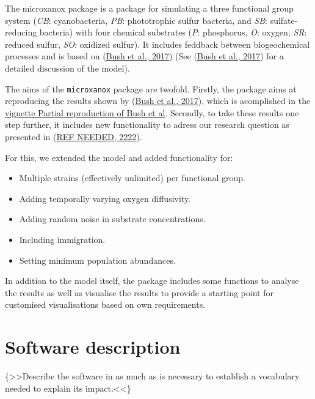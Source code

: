 \documentclass[]{elsarticle} %
\providecommand{\tightlist}{%
  \setlength{\itemsep}{0pt}\setlength{\parskip}{0pt}}
\begin{document}
The microxanox package is a package for simulating a three functional
group system (\emph{CB}: cyanobacteria, \emph{PB}: phototrophic sulfur
bacteria, and \emph{SB}: sulfate-reducing bacteria) with four chemical
substrates (\emph{P}: phosphorus, \emph{O}: oxygen, \emph{SR}: reduced
sulfur, \emph{SO}: oxidized sulfur). It includes feddback between
biogeochemical processes and is based on
(\protect\hyperlink{ref-Bush2017}{Bush et al., 2017}) (See
(\protect\hyperlink{ref-Bush2017}{Bush et al., 2017}) for a detailed
discussion of the model).

The aims of the \texttt{microxanox} package are twofold. Firstly, the
package aims at reproducing the results shown by
(\protect\hyperlink{ref-Bush2017}{Bush et al., 2017}), which is
acomplished in the \href{LINK\%20NEEDED}{vignette Partial reproduction
of Bush et al}. Secondly, to take these results one step further, it
includes new functionality to adress our research question as presented
in (\protect\hyperlink{ref-REF_NEEDED}{REF NEEDED, 2222}).

For this, we extended the model and added functionality for:

\begin{itemize}
\tightlist
\item
  Multiple strains (effectively unlimited) per functional group.
\item
  Adding temporally varying oxygen diffusivity.
\item
  Adding random noise in substrate concentrations.
\item
  Including immigration.
\item
  Setting minimum population abundances.
\end{itemize}

In addition to the model itself, the package includes some functions to
analyse the results as well as visualise the results to provide a
starting point for customised visualisations based on own requirements.

\hypertarget{software-description}{%
\section{Software description}\label{software-description}}

\{\textgreater\textgreater Describe the software in as much as is
necessary to establish a vocabulary needed to explain its
impact.\textless\textless\}
\end{document}
